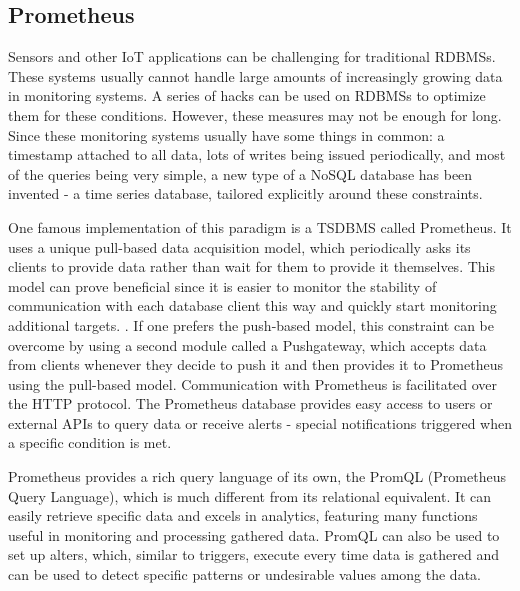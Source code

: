 \subsection{Prometheus}
\label{subsec:background:second_section:thrid_subsection}
\par Sensors and other IoT applications can be challenging for traditional RDBMSs. These systems usually cannot handle large amounts of increasingly growing data in monitoring systems. A series of hacks can be used on RDBMSs to optimize them for these conditions. However, these measures may not be enough for long\citep{timeseries}. Since these monitoring systems usually have some things in common: a timestamp attached to all data, lots of writes being issued periodically, and most of the queries being very simple, a new type of a NoSQL database has been invented - a time series database, tailored explicitly around these constraints. 
\par One famous implementation of this paradigm is a TSDBMS called Prometheus. It uses a unique pull-based data acquisition model, which periodically asks its clients to provide data rather than wait for them to provide it themselves. This model can prove beneficial since it is easier to monitor the stability of communication with each database client this way and quickly start monitoring additional targets. \citep{prometheusFAQ}. If one prefers the push-based model, this constraint can be overcome by using a second module called a Pushgateway, which accepts data from clients whenever they decide to push it and then provides it to Prometheus using the pull-based model. \citep{prometheusPushing/}
Communication with Prometheus is facilitated over the HTTP protocol. The Prometheus database provides easy access to users or external APIs to query data or receive alerts - special notifications triggered when a specific condition is met. \citep{prometheusFAQ}
\par Prometheus provides a rich query language of its own, the PromQL (Prometheus Query Language), which is much different from its relational equivalent. It can easily retrieve specific data and excels in analytics, featuring many functions useful in monitoring and processing gathered data. PromQL can also be used to set up alters, which, similar to triggers, execute every time data is gathered and can be used to detect specific patterns or undesirable values among the data. \citep{PromQL}
